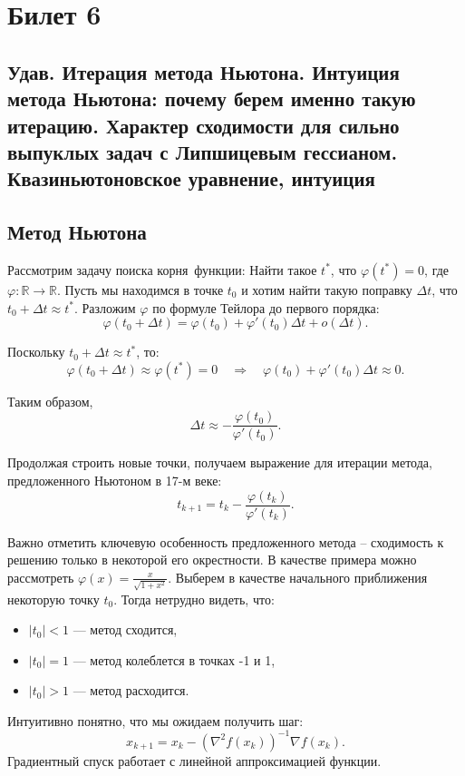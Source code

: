 \section{Билет 6}

\subsection{Удав. Итерация метода Ньютона. Интуиция метода Ньютона: почему берем
    именно такую итерацию. Характер сходимости для сильно выпуклых
    задач с Липшицевым гессианом. Квазиньютоновское уравнение, интуиция}

\subsection*{Метод Ньютона}

Рассмотрим задачу поиска \guillemetleft корня\guillemetright \, функции:
Найти такое $t^*$, что $\varphi(t^*) = 0$,
где $\varphi : \mathbb{R} \to \mathbb{R}$.
Пусть мы находимся в точке $t_0$ и хотим найти такую поправку $\Delta t$, что $t_0 + \Delta t \approx t^*$. Разложим $\varphi$ по формуле Тейлора до первого порядка:
$$ \varphi(t_0 + \Delta t) = \varphi(t_0) + \varphi'(t_0) \Delta t + o(\Delta t). $$

Поскольку $t_0 + \Delta t \approx t^*$, то:
$$ \varphi(t_0 + \Delta t) \approx \varphi(t^*) = 0 \quad \Rightarrow \quad \varphi(t_0) + \varphi'(t_0) \Delta t \approx 0. $$

Таким образом,
$$ \Delta t \approx - \frac{\varphi(t_0)}{\varphi'(t_0)}. $$

Продолжая строить новые точки, получаем выражение для итерации метода, предложенного Ньютоном в 17-м веке:
$$ t_{k+1} = t_k - \frac{\varphi(t_k)}{\varphi'(t_k)}. $$

Важно отметить ключевую особенность предложенного метода – сходимость к решению только в некоторой его окрестности.
В качестве примера можно рассмотреть $\varphi(x) = \frac{x}{\sqrt{1+x^2}}$.
Выберем в качестве начального приближения некоторую точку $t_0$. Тогда нетрудно видеть, что:
\begin{itemize}
    \item $|t_0| < 1$ — метод сходится,
    \item $|t_0| = 1$ — метод колеблется в точках -1 и 1,
    \item $|t_0| > 1$ — метод расходится.
\end{itemize}

Интуитивно понятно, что мы ожидаем получить шаг:
$$ x_{k+1} = x_k - (\nabla^2 f(x_k))^{-1} \nabla f(x_k). $$
Градиентный спуск работает с линейной аппроксимацией функции.

